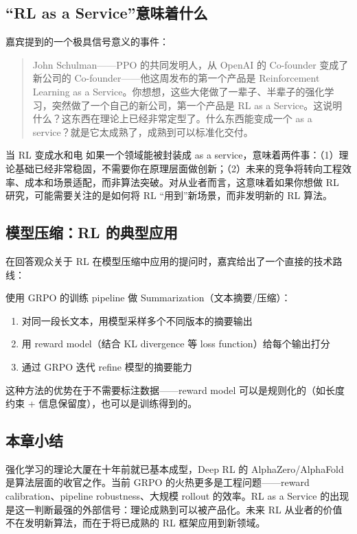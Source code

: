 \documentclass[a4paper]{article}
\begin{document}
\subsection{``RL as a Service''意味着什么}

嘉宾提到的一个极具信号意义的事件：

\begin{quote}
John Schulman——PPO 的共同发明人，从 OpenAI 的 Co-founder 变成了新公司的 Co-founder——他这周发布的第一个产品是 Reinforcement Learning as a Service。你想想，这些大佬做了一辈子、半辈子的强化学习，突然做了一个自己的新公司，第一个产品是 RL as a Service。这说明什么？这东西在理论上已经非常定型了。什么东西能变成一个 as a service？就是它太成熟了，成熟到可以标准化交付。
\end{quote}

\begin{warningbox}{当 RL 变成水和电}
如果一个领域能被封装成 as a service，意味着两件事：（1）理论基础已经非常稳固，不需要你在原理层面做创新；（2）未来的竞争将转向工程效率、成本和场景适配，而非算法突破。对从业者而言，这意味着如果你想做 RL 研究，可能需要关注的是如何将 RL ``用到''新场景，而非发明新的 RL 算法。
\end{warningbox}

\subsection{模型压缩：RL 的典型应用}

在回答观众关于 RL 在模型压缩中应用的提问时，嘉宾给出了一个直接的技术路线：

使用 GRPO 的训练 pipeline 做 Summarization（文本摘要/压缩）：
\begin{enumerate}
    \item 对同一段长文本，用模型采样多个不同版本的摘要输出
    \item 用 reward model（结合 KL divergence 等 loss function）给每个输出打分
    \item 通过 GRPO 迭代 refine 模型的摘要能力
\end{enumerate}

这种方法的优势在于不需要标注数据——reward model 可以是规则化的（如长度约束 + 信息保留度），也可以是训练得到的。

\subsection{本章小结}

强化学习的理论大厦在十年前就已基本成型，Deep RL 的 AlphaZero/AlphaFold 是算法层面的收官之作。当前 GRPO 的火热更多是工程问题——reward calibration、pipeline robustness、大规模 rollout 的效率。RL as a Service 的出现是这一判断最强的外部信号：理论成熟到可以被产品化。未来 RL 从业者的价值不在发明新算法，而在于将已成熟的 RL 框架应用到新领域。
\end{document}
